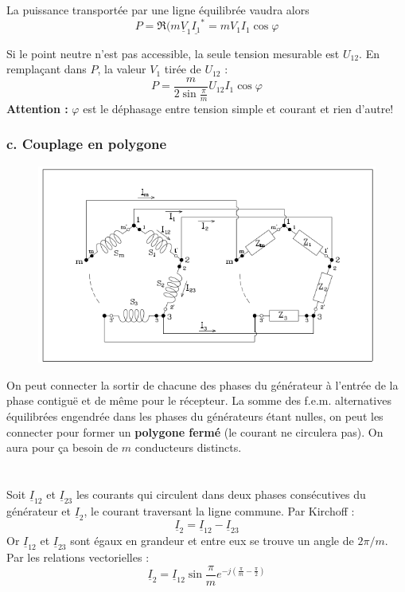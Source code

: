		La puissance transportée par une ligne équilibrée vaudra alors 
		\begin{equation}
		P = \Re(m \underline{V}_1\underline{I_1}^* = mV_1I_1\cos\varphi
		\end{equation}
		
		Si le point neutre n'est pas accessible, la seule tension mesurable 
		est $U_{12}$. En remplaçant dans $P$, la valeur $V_1$ tirée de 
		$U_{12}$ :
		\begin{equation}
		P = \frac{m}{2\sin\frac{\pi}{m}}U_{12}I_1\cos\varphi
		\end{equation}
		\textbf{Attention :} $\varphi$ est le déphasage entre tension simple 
		et courant et rien d'autre!
		
		
		\subsubsection{c. Couplage en polygone}
		\begin{figure}
		\vspace{-5mm}
		\includegraphics[scale=0.4]{ch1/image8.png}
		\end{figure}		
		On peut connecter la sortir de chacune des phases du générateur à 
		l'entrée de la phase contiguë et de même pour le récepteur. La somme 
		des f.e.m. alternatives équilibrées engendrée dans les phases du 
		générateurs étant nulles, on peut les connecter pour former un 
		\textbf{polygone fermé} (le courant ne circulera pas). On aura pour ça
		besoin de $m$ conducteurs distincts.\\
		\ \\
		\\

		Soit $\underline{I}_{12}$ et $\underline{I}_{23}$ les courants qui 
		circulent dans deux phases consécutives du générateur et $\underline{I}_
		2$, le courant traversant la ligne commune. Par Kirchoff :
		\begin{equation}
		\underline{I}_2 = \underline{I}_{12}-\underline{I}_{23}
		\end{equation}
		Or $\underline{I}_{12}$ et $\underline{I}_{23}$  sont égaux en 
		grandeur et entre eux se trouve un angle de $2\pi/m$. Par les 
		relations vectorielles :
		\begin{equation}
		\underline{I}_2 = \underline{I}_{12}\sin\frac{\pi}{m}e^{-j\left(\frac{
		\pi}{m}-\frac{\pi}{2}\right)}
		\end{equation} 
		
